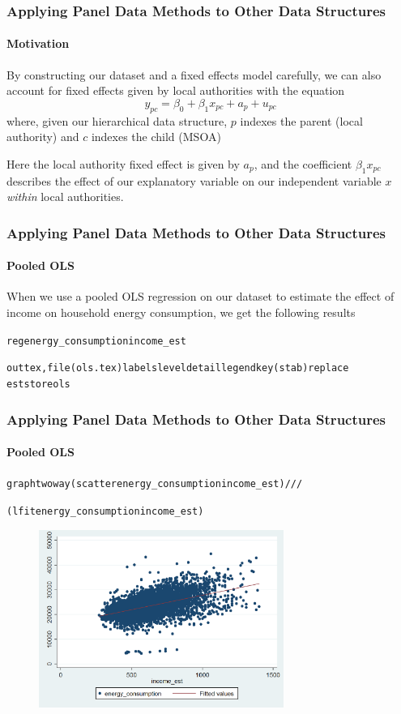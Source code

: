 \documentclass{beamer}
\begin{document}
  \begin{frame}
    \frametitle{Applying Panel Data Methods to Other Data Structures}
    \framesubtitle{Motivation}
    
    By constructing our dataset and a fixed effects model carefully, we can also account for fixed effects given by local authorities with the equation
    $$ y_{pc} = \beta_{0} + \beta_{1}x_{pc} + a_{p} + u_{pc} $$
    where, given our hierarchical data structure, $p$ indexes the parent (local authority) and $c$ indexes the child (MSOA)
    
    \bigskip
    
    Here the local authority fixed effect is given by $a_{p}$, and the coefficient $\beta_{1}x_{pc}$ describes the effect of our explanatory variable on our independent variable $x$ \textit{within} local authorities.
    
  \end{frame}
  
  \begin{frame}
    \frametitle{Applying Panel Data Methods to Other Data Structures}
    \framesubtitle{Pooled OLS}
    When we use a pooled OLS regression on our dataset to estimate the effect of income on household energy consumption, we get the following results
    \tiny
    \begin{alltt}
    reg energy\_consumption income\_est
    
    outtex, file(ols.tex) labels level detail legend key(stab) replace
    est store ols
    \end{alltt}

    
  \end{frame}
  
  \begin{frame}
    \frametitle{Applying Panel Data Methods to Other Data Structures}
    \framesubtitle{Pooled OLS}
    \tiny
    \begin{alltt}
    graph twoway (scatter energy\_consumption income\_est) ///
    
    (lfit energy\_consumption income\_est)
    \end{alltt}
    
    \begin{figure}
    \includegraphics[width=8cm]{../stata_code/ols.png}
    \centering
    \end{figure}
  \end{frame}
  
\end{document}

